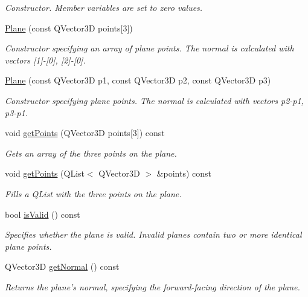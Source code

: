 \begin{DoxyCompactItemize}
\begin{DoxyCompactList}\small\item\em Constructor. Member variables are set to zero values. \end{DoxyCompactList}\item 
\hyperlink{class_plane_a044f4c5015112c8c5148ae28b41b8637}{Plane} (const Q\-Vector3\-D points\mbox{[}3\mbox{]})
\begin{DoxyCompactList}\small\item\em Constructor specifying an array of plane points. The normal is calculated with vectors \mbox{[}1\mbox{]}-\/\mbox{[}0\mbox{]}, \mbox{[}2\mbox{]}-\/\mbox{[}0\mbox{]}. \end{DoxyCompactList}\item 
\hyperlink{class_plane_affc3a1de45dcac9b65569eef3635eba4}{Plane} (const Q\-Vector3\-D p1, const Q\-Vector3\-D p2, const Q\-Vector3\-D p3)
\begin{DoxyCompactList}\small\item\em Constructor specifying plane points. The normal is calculated with vectors p2-\/p1, p3-\/p1. \end{DoxyCompactList}\item 
void \hyperlink{class_plane_af04d6d582cfc6bb3fdebfb7d2711c0b8}{get\-Points} (Q\-Vector3\-D points\mbox{[}3\mbox{]}) const 
\begin{DoxyCompactList}\small\item\em Gets an array of the three points on the plane. \end{DoxyCompactList}\item 
void \hyperlink{class_plane_ad8ca5183fed9db77a2cbb552d780aa9d}{get\-Points} (Q\-List$<$ Q\-Vector3\-D $>$ \&points) const 
\begin{DoxyCompactList}\small\item\em Fills a Q\-List with the three points on the plane. \end{DoxyCompactList}\item 
bool \hyperlink{class_plane_a9324f303beccf7ec9c6d3a5e371b7ca7}{is\-Valid} () const 
\begin{DoxyCompactList}\small\item\em Specifies whether the plane is valid. Invalid planes contain two or more identical plane points. \end{DoxyCompactList}\item 
Q\-Vector3\-D \hyperlink{class_plane_aeaae7bd417894c587423251818f16197}{get\-Normal} () const 
\begin{DoxyCompactList}\small\item\em Returns the plane's normal, specifying the forward-\/facing direction of the plane. \end{DoxyCompactList}\item 

\end{DoxyCompactItemize}
